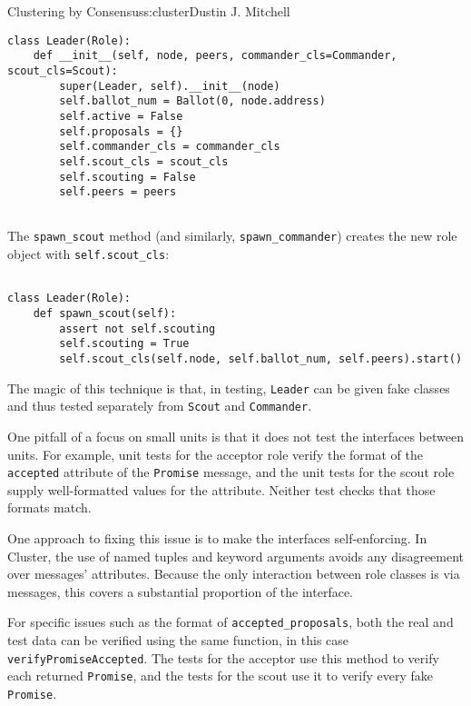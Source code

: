 \begin{aosachapter}{Clustering by Consensus}{s:cluster}{Dustin J. Mitchell}
\begin{verbatim}
class Leader(Role):
    def __init__(self, node, peers, commander_cls=Commander, scout_cls=Scout):
        super(Leader, self).__init__(node)
        self.ballot_num = Ballot(0, node.address)
        self.active = False
        self.proposals = {}
        self.commander_cls = commander_cls
        self.scout_cls = scout_cls
        self.scouting = False
        self.peers = peers
    
\end{verbatim}

The \texttt{spawn\_scout} method (and similarly,
\texttt{spawn\_commander}) creates the new role object with
\texttt{self.scout\_cls}:

\begin{verbatim}

class Leader(Role):
    def spawn_scout(self):
        assert not self.scouting
        self.scouting = True
        self.scout_cls(self.node, self.ballot_num, self.peers).start()
\end{verbatim}

The magic of this technique is that, in testing, \texttt{Leader} can be
given fake classes and thus tested separately from \texttt{Scout} and
\texttt{Commander}.

\label{interface-correctness}

One pitfall of a focus on small units is that it does not test the
interfaces between units. For example, unit tests for the acceptor role
verify the format of the \texttt{accepted} attribute of the
\texttt{Promise} message, and the unit tests for the scout role supply
well-formatted values for the attribute. Neither test checks that those
formats match.

One approach to fixing this issue is to make the interfaces
self-enforcing. In Cluster, the use of named tuples and keyword
arguments avoids any disagreement over messages' attributes. Because the
only interaction between role classes is via messages, this covers a
substantial proportion of the interface.

For specific issues such as the format of \texttt{accepted\_proposals},
both the real and test data can be verified using the same function, in
this case \texttt{verifyPromiseAccepted}. The tests for the acceptor use
this method to verify each returned \texttt{Promise}, and the tests for
the scout use it to verify every fake \texttt{Promise}.

\label{integration-testing}


\end{aosachapter}
